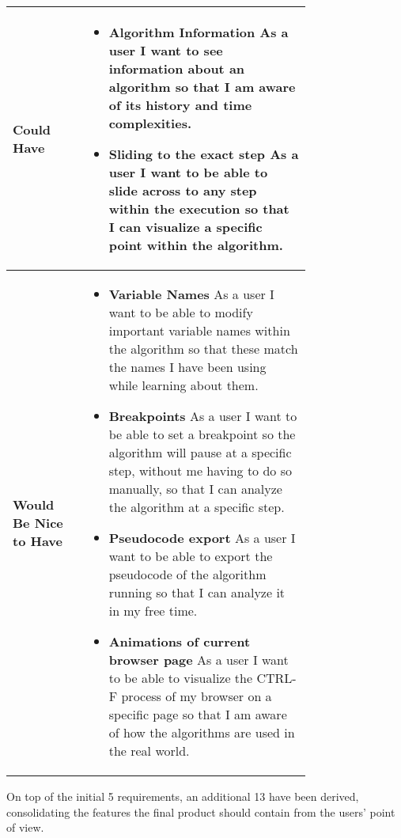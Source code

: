 \begin{longtable}{|l|p{0.75\linewidth}|}
\hline
\textbf{Could Have} &
\begin{itemize}
    \item \textbf{Algorithm Information} As a user I want to see information about an algorithm so that I am aware of its history and time complexities.
    \item \textbf{Sliding to the exact step} As a user I want to be able to slide across to any step within the execution so that I can visualize a specific point within the algorithm.
\end{itemize} \\
\hline
\textbf{Would Be Nice to Have} &
\begin{itemize}
    \item \textbf{Variable Names} As a user I want to be able to modify important variable names within the algorithm so that these match the names I have been using while learning about them.
    \item \textbf{Breakpoints} As a user I want to be able to set a breakpoint so the algorithm will pause at a specific step, without me having to do so manually, so that I can analyze the algorithm at a specific step.
    \item \textbf{Pseudocode export} As a user I want to be able to export the pseudocode of the algorithm running so that I can analyze it in my free time.
    \item \textbf{Animations of current browser page} As a user I want to be able to visualize the CTRL-F process of my browser on a specific page so that I am aware of how the algorithms are used in the real world.
\end{itemize} \\
\hline

\end{longtable}

On top of the initial 5 requirements, an additional 13 have been derived, consolidating the features the final product should contain from the users' point of view.